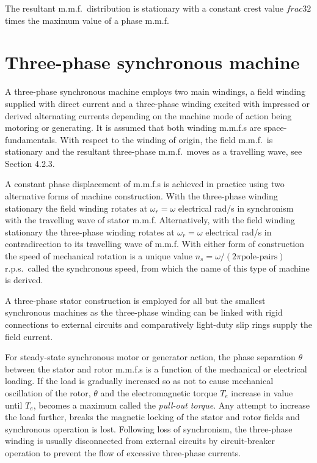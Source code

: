 \documentclass[a4paper,numbers=noenddot,12pt]{scrbook}
\begin{document}
    The resultant m.m.f.\ distribution is stationary with a constant crest value $frac{3}{2}$ times the maximum value of a phase m.m.f.
    \chapter{Three-phase synchronous machine}

    A three-phase synchronous machine employs two main windings, a field winding supplied with direct current and a three-phase winding excited with impressed or derived alternating currents depending on the machine mode of action being motoring or generating. It is assumed that both winding m.m.f.s are space-fundamentals. With respect to the winding of origin, the field m.m.f.\ is stationary and the resultant three-phase m.m.f.\ moves as a travelling wave, see Section 4.2.3.

    A constant phase displacement of m.m.f.s is achieved in practice using two alternative forms of machine construction. With the three-phase winding stationary the field winding rotates at $\omega_r = \omega$ electrical rad/s in synchronism with the travelling wave of stator m.m.f. Alternatively, with the field winding stationary the three-phase winding rotates at $\omega_r = \omega$ electrical rad/s in contradirection to its travelling wave of m.m.f. With either form of
    construction the speed of mechanical rotation is a unique value $n_s = \omega / (2 \pi \text{pole-pairs})$ r.p.s.\ called the synchronous speed, from which the name of this type of machine is derived.

    A three-phase stator construction is employed for all but the smallest synchronous machines as the three-phase winding can be linked with rigid connections to external circuits and comparatively light-duty slip rings supply the field current. 

    For steady-state synchronous motor or generator action, the phase separation $\theta$ between the stator and rotor m.m.f.s is a function of the mechanical or electrical loading. If the load is gradually increased so as not to cause mechanical oscillation of the rotor, $\theta$ and the electromagnetic torque $T_e$ increase in value until $T_e$, becomes a maximum called the \textit{pull-out torque}. Any attempt to increase the load further, breaks the magnetic locking of the stator and rotor
    fields and synchronous operation is lost. Following loss of synchronism, the three-phase winding is usually disconnected from external circuits by circuit-breaker operation to prevent the flow of excessive three-phase currents.
\end{document}

